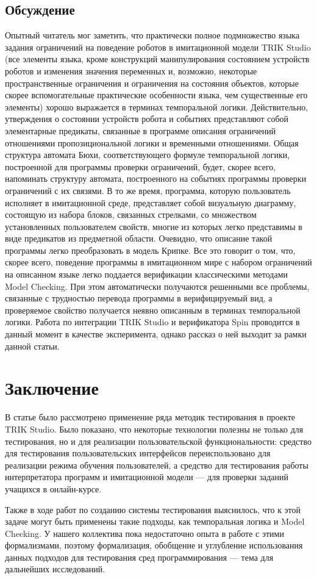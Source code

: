 \documentclass[conference]{IEEEtran}
\begin{document}
\subsection{Обсуждение}
Опытный читатель мог заметить, что практически полное подмножество языка задания ограничений 
на поведение роботов в имитационной модели TRIK Studio (все элементы языка, кроме 
конструкций манипулирования состоянием устройств роботов и изменения значения переменных 
и, возможно, некоторые пространственные ограничения и ограничения на состояния объектов, 
которые скорее вспомогательные практические особенности языка, чем существенные его 
элементы) хорошо выражается в терминах темпоральной логики. Действительно, утверждения 
о состоянии устройств робота и событиях представляют собой элементарные предикаты, 
связанные в программе описания ограничений отношениями пропозициональной логики и временными 
отношениями. Общая структура автомата Бюхи, соответствующего формуле темпоральной логики, 
построенной для программы проверки ограничений, будет, скорее всего, напоминать структуру 
автомата, построенного на событиях программы проверки ограничений с их связями. В то же 
время, программа, которую пользователь исполняет в имитационной среде, представляет 
собой визуальную диаграмму, состоящую из набора блоков, связанных стрелками, со множеством 
установленных пользователем свойств, многие из которых легко представимы в виде предикатов 
из предметной области. Очевидно, что описание такой программы легко преобразовать в модель 
Крипке. Все это говорит о том, что, скорее всего, поведение программы в имитационном 
мире с набором ограничений на описанном языке легко поддается верификации классическими 
методами Model Checking. При этом автоматически получаются решенными все проблемы, 
связанные с трудностью перевода программы в верифицируемый вид, а проверяемое свойство 
получается неявно описанным в терминах темпоральной логики. Работа по интеграции TRIK Studio 
и верификатора Spin проводится в данный момент в качестве эксперимента, однако рассказ 
о ней выходит за рамки данной статьи.

\section{Заключение}
В статье было рассмотрено применение ряда методик тестирования в проекте TRIK Studio. 
Было показано, что некоторые технологии полезны не только для тестирования, но и для 
реализации пользовательской функциональности: средство для тестирования пользовательских 
интерфейсов переиспользовано для реализации режима обучения пользователей, а средство 
для тестирования работы интерпретатора программ и имитационной модели --- для проверки 
заданий учащихся в онлайн-курсе.

Также в ходе работ по созданию системы тестирования выяснилось, что к этой задаче 
могут быть применены такие подходы, как темпоральная логика и Model Checking. У нашего 
коллектива пока недостаточно опыта в работе с этими формализмами, поэтому формализация, 
обобщение и углубление использования данных подходов для тестирования сред программирования 
--- тема для дальнейших исследований.



\end{document}
